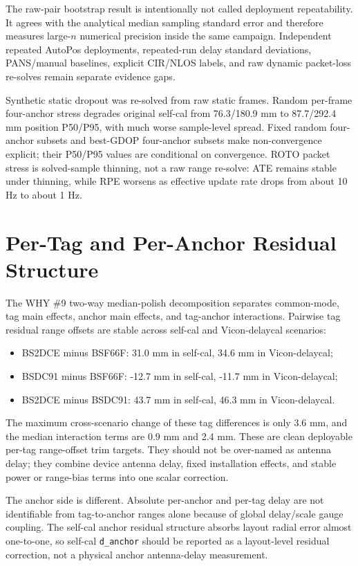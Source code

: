 \documentclass[11pt,a4paper]{article}
\newcommand{\case}[1]{\texttt{#1}}
\begin{document}
The raw-pair bootstrap result is intentionally not called deployment repeatability.
It agrees with the analytical median sampling standard error and therefore measures
large-\(n\) numerical precision inside the same campaign.  Independent repeated
AutoPos deployments, repeated-run delay standard deviations, PANS/manual baselines,
explicit CIR/NLOS labels, and raw dynamic packet-loss re-solves remain separate
evidence gaps.

Synthetic static dropout was re-solved from raw static frames.  Random per-frame
four-anchor stress degrades original self-cal from 76.3/180.9 mm to 87.7/292.4 mm
position P50/P95, with much worse sample-level spread.  Fixed random four-anchor
subsets and best-GDOP four-anchor subsets make non-convergence explicit; their P50/P95
values are conditional on convergence.  ROTO packet stress is solved-sample thinning,
not a raw range re-solve: ATE remains stable under thinning, while RPE worsens as
effective update rate drops from about 10 Hz to about 1 Hz.

\section{Per-Tag and Per-Anchor Residual Structure}

The WHY \#9 two-way median-polish decomposition separates common-mode, tag main
effects, anchor main effects, and tag-anchor interactions.  Pairwise tag residual
range offsets are stable across self-cal and Vicon-delaycal scenarios:
\begin{itemize}
    \item BS2DCE minus BSF66F: 31.0 mm in self-cal, 34.6 mm in Vicon-delaycal;
    \item BSDC91 minus BSF66F: -12.7 mm in self-cal, -11.7 mm in Vicon-delaycal;
    \item BS2DCE minus BSDC91: 43.7 mm in self-cal, 46.3 mm in Vicon-delaycal.
\end{itemize}
The maximum cross-scenario change of these tag differences is only 3.6 mm, and
the median interaction terms are 0.9 mm and 2.4 mm.  These are clean deployable
per-tag range-offset trim targets.  They should not be over-named as antenna delay;
they combine device antenna delay, fixed installation effects, and stable power or
range-bias terms into one scalar correction.

The anchor side is different.  Absolute per-anchor and per-tag delay are not
identifiable from tag-to-anchor ranges alone because of global delay/scale gauge
coupling.  The self-cal anchor residual structure absorbs layout radial error
almost one-to-one, so self-cal \case{d\_anchor} should be reported as a layout-level
residual correction, not a physical anchor antenna-delay measurement.
\end{document}
